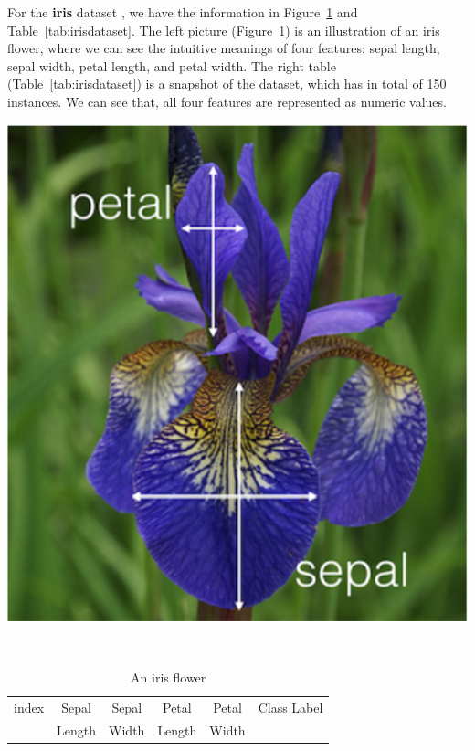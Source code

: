 \begin{example}\label{example:iris}
For the \textbf{iris} dataset \cite{Dua:2019}, we have the information in Figure~\ref{fig:irisflowerexample} and Table~\ref{tab:irisdataset}. The left picture (Figure~\ref{fig:irisflowerexample}) is an illustration of an iris flower, where we can see the intuitive meanings of four features: sepal length, sepal width, petal length, and petal width. The right table (Table~\ref{tab:irisdataset}) is a snapshot of the dataset, which has in total of 150 instances. We can see that, all four features are represented as numeric values. 
\begin{table}[!htbp]
\small
\begin{minipage}{0.35\textwidth}
    \centering
    \includegraphics[width=\textwidth]{images/foundations/iris.png}
    \caption{An iris flower}
    \label{fig:irisflowerexample}
\end{minipage}~~~~~
\begin{minipage}{0.6\textwidth}
    \centering
    \begin{tabular}{|c|c|c|c|c|l|}
    \hline
       index  & Sepal & Sepal & Petal & Petal & Class Label\\
         & Length & Width & Length & Width &  \\

\end{tabular}
\end{minipage}
\end{table}
\end{example}
